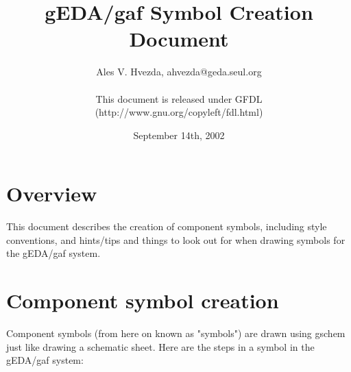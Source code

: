 \documentclass{article}
\title{gEDA/gaf Symbol Creation Document}
\author{Ales V. Hvezda, ahvezda@geda.seul.org\\
	\\
	This document is released under GFDL\\ 
	(http://www.gnu.org/copyleft/fdl.html)}
\date{September 14th, 2002}
\begin{document}
\maketitle
\newpage

\tableofcontents
\newpage


\section{Overview}

This document describes the creation of component symbols, including style
conventions, and hints/tips and things to look out for when drawing symbols
for the gEDA/gaf system.

\section{Component symbol creation}

Component symbols (from here on known as "symbols") are drawn
using gschem just like drawing a schematic sheet.  Here are the steps in
a symbol in the gEDA/gaf system:
\end{document}
